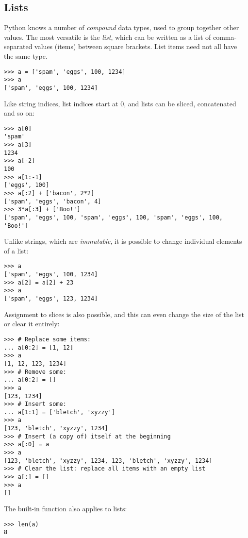 \documentclass{manual}
\begin{document}
\subsection{Lists \label{lists}}

Python knows a number of \emph{compound} data types, used to group
together other values.  The most versatile is the \emph{list}, which
can be written as a list of comma-separated values (items) between
square brackets.  List items need not all have the same type.

\begin{verbatim}
>>> a = ['spam', 'eggs', 100, 1234]
>>> a
['spam', 'eggs', 100, 1234]
\end{verbatim}

Like string indices, list indices start at 0, and lists can be sliced,
concatenated and so on:

\begin{verbatim}
>>> a[0]
'spam'
>>> a[3]
1234
>>> a[-2]
100
>>> a[1:-1]
['eggs', 100]
>>> a[:2] + ['bacon', 2*2]
['spam', 'eggs', 'bacon', 4]
>>> 3*a[:3] + ['Boo!']
['spam', 'eggs', 100, 'spam', 'eggs', 100, 'spam', 'eggs', 100, 'Boo!']
\end{verbatim}

Unlike strings, which are \emph{immutable}, it is possible to change
individual elements of a list:

\begin{verbatim}
>>> a
['spam', 'eggs', 100, 1234]
>>> a[2] = a[2] + 23
>>> a
['spam', 'eggs', 123, 1234]
\end{verbatim}

Assignment to slices is also possible, and this can even change the size
of the list or clear it entirely:

\begin{verbatim}
>>> # Replace some items:
... a[0:2] = [1, 12]
>>> a
[1, 12, 123, 1234]
>>> # Remove some:
... a[0:2] = []
>>> a
[123, 1234]
>>> # Insert some:
... a[1:1] = ['bletch', 'xyzzy']
>>> a
[123, 'bletch', 'xyzzy', 1234]
>>> # Insert (a copy of) itself at the beginning
>>> a[:0] = a
>>> a
[123, 'bletch', 'xyzzy', 1234, 123, 'bletch', 'xyzzy', 1234]
>>> # Clear the list: replace all items with an empty list
>>> a[:] = []
>>> a
[]
\end{verbatim}

The built-in function  also applies to lists:

\begin{verbatim}
>>> len(a)
8
\end{verbatim}
\end{document}
